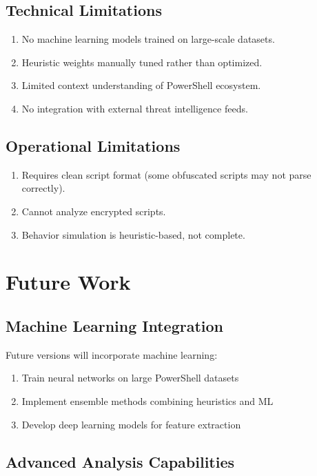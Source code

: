 \documentclass[10pt,conference,a4paper]{IEEEtran}
\begin{document}
\subsection{Technical Limitations}

\begin{enumerate}
\item No machine learning models trained on large-scale datasets.
\item Heuristic weights manually tuned rather than optimized.
\item Limited context understanding of PowerShell ecosystem.
\item No integration with external threat intelligence feeds.
\end{enumerate}

\subsection{Operational Limitations}

\begin{enumerate}
\item Requires clean script format (some obfuscated scripts may not parse correctly).
\item Cannot analyze encrypted scripts.
\item Behavior simulation is heuristic-based, not complete.
\end{enumerate}

\section{Future Work}

\subsection{Machine Learning Integration}

Future versions will incorporate machine learning:

\begin{enumerate}
\item Train neural networks on large PowerShell datasets
\item Implement ensemble methods combining heuristics and ML
\item Develop deep learning models for feature extraction
\end{enumerate}

\subsection{Advanced Analysis Capabilities}
\end{document}
